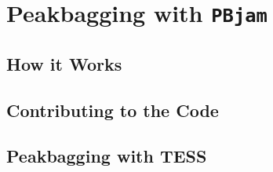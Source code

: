 \chapter{Peakbagging with \texttt{PBjam}}

\section{How it Works}

\section{Contributing to the Code}

\section{Peakbagging with TESS}
